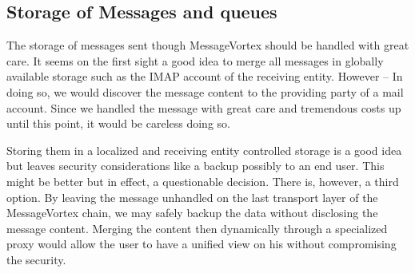\subsection{Storage of Messages and queues}
The storage of messages sent though MessageVortex should be handled with great care. It seems on the first sight a good idea to merge all messages in globally available storage such as the IMAP account of the receiving entity. However -- In doing so, we would discover the message content to the providing party of a mail account. Since we handled the message with great care and tremendous costs up until this point, it would be careless doing so. 

Storing them in a localized and receiving entity controlled storage is a good idea but leaves security considerations like a backup possibly to an end user. This might be better but in effect, a questionable decision. There is, however, a third option. By leaving the message unhandled on the last transport layer of the MessageVortex chain, we may safely backup the data without disclosing the message content. Merging the content then dynamically through a specialized proxy would allow the user to have a unified view on his without compromising the security.

